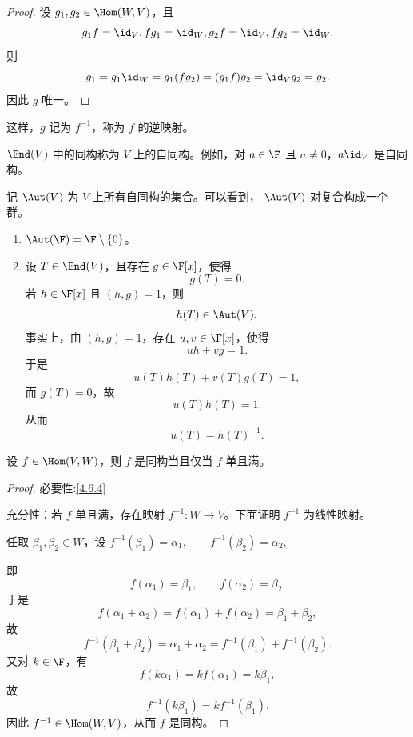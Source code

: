 \begin{proof}
	设 $g_1,g_2\in\Hom(W,V)$，且
	\[
	g_1f=\id_{V}, fg_1=\id_{W},	g_2f=\id_{V}, fg_2=\id_{W}.
	\]
	则
	\[
	g_1
	=g_1\id_{W}
	=g_1(fg_2)
	=(g_1f)g_2
	=\id_{V}g_2
	=g_2.
	\]
	因此 $g$ 唯一。
\end{proof}

\label{p1:concept:c4-l1979}这样，$g$ 记为 $f^{-1}$，称为 $f$ 的逆映射。

\begin{definition}\label{p1:concept:c4-l1981}
	$\End(V)$ 中的同构称为 $V$ 上的自同构。例如，对
	$a\in\F$ 且 $a\neq 0$，$a\id_{V}$ 是自同构。
	
	记 $\Aut(V)$ 为 $V$ 上所有自同构的集合。可以看到，
	$\Aut(V)$ 对复合构成一个群。
\end{definition}

\begin{example}
	\begin{enumerate}
		\item $\Aut(\F)=\F\setminus\{0\}$。
		\item 设 $T\in\End(V)$，且存在 $g\in\F[x]$，使得
		\[
		g(T)=0.
		\]
		若 $h\in\F[x]$ 且 $(h,g)=1$，则
		\[
		h(T)\in\Aut(V).
		\]
		事实上，由 $(h,g)=1$，存在 $u,v\in\F[x]$，使得
		\[
		uh+vg=1.
		\]
		于是
		\[
		u(T)h(T)+v(T)g(T)=1,
		\]
		而 $g(T)=0$，故
		\[
		u(T)h(T)=1.
		\]
		从而
		\[
		u(T)=h(T)^{-1}.
		\]
	\end{enumerate}
\end{example}

\begin{lemma}
	设 $f\in\Hom(V,W)$，则 $f$ 是同构当且仅当 $f$ 单且满。
\end{lemma}

\begin{proof}
	必要性:\ref{4.6.4}
	
	充分性：若 $f$ 单且满，存在映射
	$f^{-1}:W\to V$。下面证明 $f^{-1}$ 为线性映射。
	
	任取 $\beta_1,\beta_2\in W$，设
$	f^{-1}(\beta_1)=\alpha_1,\qquad
	f^{-1}(\beta_2)=\alpha_2,$
	
	即
	\[
	f(\alpha_1)=\beta_1,\qquad
	f(\alpha_2)=\beta_2.
	\]
	于是
	\[
	f(\alpha_1+\alpha_2)=f(\alpha_1)+f(\alpha_2)=\beta_1+\beta_2,
	\]
	故
	\[
	f^{-1}(\beta_1+\beta_2)
	=
	\alpha_1+\alpha_2
	=
	f^{-1}(\beta_1)+f^{-1}(\beta_2).
	\]
	又对 $k\in\F$，有
	\[
	f(k\alpha_1)=kf(\alpha_1)=k\beta_1,
	\]
	故
	\[
	f^{-1}(k\beta_1)=kf^{-1}(\beta_1).
	\]
	因此 $f^{-1}\in\Hom(W,V)$，从而 $f$ 是同构。
\end{proof}

